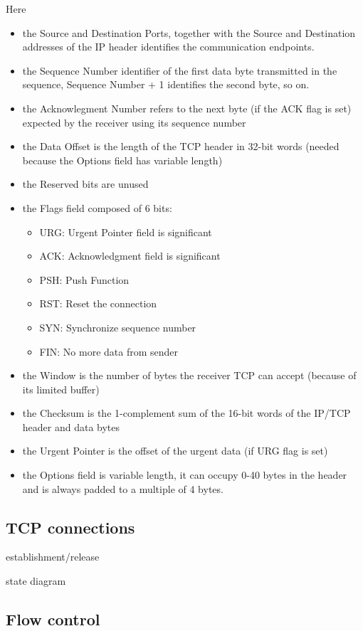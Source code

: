 Here
\begin{itemize}
  \item the Source and Destination Ports, together with the Source and Destination
  addresses of the IP header identifies the communication endpoints.
  \item the Sequence Number identifier of the first data byte transmitted in the sequence,
  Sequence Number + 1 identifies the second byte, so on.
  \item the Acknowlegment Number refers to the next byte (if the ACK flag is set) expected
  by the receiver using its sequence number
  \item the Data Offset is the length of the TCP header in 32-bit words (needed because the
  Options field has variable length)
  \item the Reserved bits are unused
  \item the Flags field composed of 6 bits:
  \begin{itemize}
    \item URG: Urgent Pointer field is significant
    \item ACK: Acknowledgment field is significant
    \item PSH: Push Function
    \item RST: Reset the connection
    \item SYN: Synchronize sequence number
    \item FIN: No more data from sender
  \end{itemize}
  \item the Window is the number of bytes the receiver TCP can accept (because of its
  limited buffer)
  \item the Checksum is the 1-complement sum of the 16-bit words of the IP/TCP header and
  data bytes
  \item the Urgent Pointer is the offset of the urgent data (if URG flag is set)
  \item the Options field is variable length, it can occupy 0-40 bytes in the header and is
  always padded to a multiple of 4 bytes.
\end{itemize}

\subsection{TCP connections}

establishment/release

state diagram

\subsection{Flow control}

